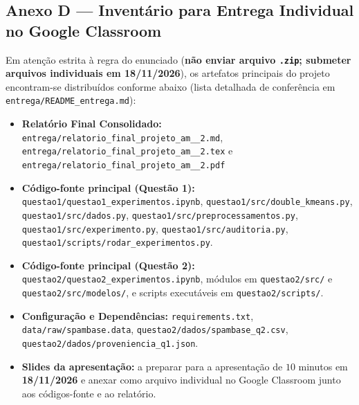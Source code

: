 \documentclass[a4paper,11pt]{article}
\begin{document}
\subsection*{Anexo D --- Inventário para Entrega Individual no Google Classroom}\label{sec:anexo-d-inventario-para-entrega-individual-no-google-classroom}


Em atenção estrita à regra do enunciado (\textbf{não enviar arquivo \texttt{.zip}; submeter arquivos individuais em 18/11/2026}), os artefatos principais do projeto encontram-se distribuídos conforme abaixo (lista detalhada de conferência em \texttt{entrega/\allowbreak README\_\allowbreak entrega.md}):

\begin{itemize}[leftmargin=1.5em, itemsep=0.25em, topsep=0.25em]
  \item \textbf{Relatório Final Consolidado:} \texttt{entrega/\allowbreak relatorio\_\allowbreak final\_\allowbreak projeto\_\allowbreak am\_\_\allowbreak 2.md}, \texttt{entrega/\allowbreak relatorio\_\allowbreak final\_\allowbreak projeto\_\allowbreak am\_\_\allowbreak 2.tex} e \texttt{entrega/\allowbreak relatorio\_\allowbreak final\_\allowbreak projeto\_\allowbreak am\_\_\allowbreak 2.pdf}
  \item \textbf{Código-fonte principal (Questão 1):} \texttt{questao1/\allowbreak questao1\_\allowbreak experimentos.ipynb}, \texttt{questao1/\allowbreak src/\allowbreak double\_\allowbreak kmeans.py}, \texttt{questao1/\allowbreak src/\allowbreak dados.py}, \texttt{questao1/\allowbreak src/\allowbreak preprocessamentos.py}, \texttt{questao1/\allowbreak src/\allowbreak experimento.py}, \texttt{questao1/\allowbreak src/\allowbreak auditoria.py}, \texttt{questao1/\allowbreak scripts/\allowbreak rodar\_\allowbreak experimentos.py}.
  \item \textbf{Código-fonte principal (Questão 2):} \texttt{questao2/\allowbreak questao2\_\allowbreak experimentos.ipynb}, módulos em \texttt{questao2/\allowbreak src/\allowbreak } e \texttt{questao2/\allowbreak src/\allowbreak modelos/\allowbreak }, e scripts executáveis em \texttt{questao2/\allowbreak scripts/\allowbreak }.
  \item \textbf{Configuração e Dependências:} \texttt{requirements.txt}, \texttt{data/\allowbreak raw/\allowbreak spambase.data}, \texttt{questao2/\allowbreak dados/\allowbreak spambase\_\allowbreak q2.csv}, \texttt{questao2/\allowbreak dados/\allowbreak proveniencia\_\allowbreak q1.json}.
  \item \textbf{Slides da apresentação:} a preparar para a apresentação de $10$ minutos em \textbf{18/11/2026} e anexar como arquivo individual no Google Classroom junto aos códigos-fonte e ao relatório.
\end{itemize}
\end{document}

